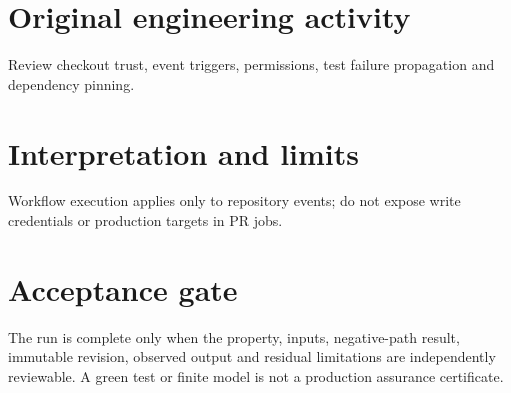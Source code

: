 \documentclass[10pt,letterpaper]{article}
\begin{document}
\section{Original engineering activity}
Review checkout trust, event triggers, permissions, test failure propagation and dependency pinning.
\section{Interpretation and limits}
Workflow execution applies only to repository events; do not expose write credentials or production targets in PR jobs.
\section{Acceptance gate}
The run is complete only when the property, inputs, negative-path result, immutable revision, observed output and residual limitations are independently reviewable. A green test or finite model is not a production assurance certificate.
\end{document}

